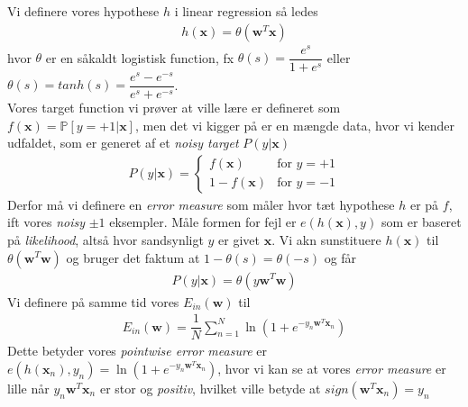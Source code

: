 \documentclass[paper=a4, fontsize=11pt]{scrartcl} %
\numberwithin{equation}{section} %
\numberwithin{figure}{section} %
\numberwithin{table}{section} %
\begin{document}
	Vi definere vores hypothese $h$ i linear regression så ledes 
	\begin{align*}
	h(\mathbf{x})=\theta(\mathbf{w}^T\mathbf{x})
	\end{align*}
	hvor $\theta$ er en såkaldt logistisk function, fx $\theta(s)=\dfrac{e^s}{1+e^s}$ eller $\theta(s)=tanh(s)=\dfrac{e^s-e^{-s}}{e^s+e^{-s}}$. \\
	
	Vores target function vi prøver at ville lære er defineret som $f(\mathbf{x})=\mathbb{P}[y=+1|\mathbf{x}]$, men det vi kigger på er en mængde data, hvor vi kender udfaldet, som er generet af et \textit{noisy target} $P(y|\mathbf{x})$
	\begin{align*}
	P(y|\mathbf{x})=\begin{cases}
	f(\mathbf{x}) & \text{for } y=+1 \\
	1-f(\mathbf{x}) & \text{for } y=-1
	\end{cases}
	\end{align*}
	Derfor må vi definere en \textit{error measure} som måler hvor tæt hypothese $h$ er på $f$, ift vores \textit{noisy} $\pm1$ eksempler. Måle formen for fejl er $e(h(\mathbf{x}),y)$ som er baseret på \textit{likelihood}, altså hvor sandsynligt $y$ er givet $\mathbf{x}$. Vi akn sunstituere $h(\mathbf{x})$ til $\theta(\mathbf{w}^T\mathbf{w})$ og bruger det faktum at $1-\theta(s)=\theta(-s)$ og får
	\begin{align*}
	P(y|\mathbf{x})=\theta(y\mathbf{w}^T\mathbf{w})
	\end{align*}
	Vi definere på samme tid vores $E_{in}(\mathbf{w})$ til
	\begin{align*}
	E_{in}(\mathbf{w})=\dfrac{1}{N}\sum_{n=1}^{N}\ln\left(1+e^{-y_n\mathbf{w}^T\mathbf{x}_n}\right)
	\end{align*}
	Dette betyder vores \textit{pointwise error measure} er $e(h(\mathbf{x}_n),y_n)=\ln(1+e^{-y_n\mathbf{w}^T\mathbf{x}_n})$, hvor vi kan se at vores \textit{error measure} er lille når $y_n\mathbf{w}^T\mathbf{x}_n$ er stor og \textit{positiv}, hvilket ville betyde at $sign(\mathbf{w}^T\mathbf{x}_n)=y_n$ \\
	
\end{document}
